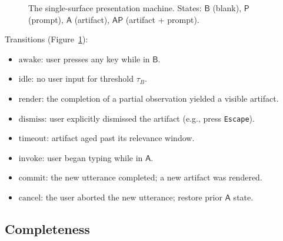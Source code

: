 \documentclass[11pt,twocolumn,a4paper]{article}
\theoremstyle{definition}
\theoremstyle{remark}
\begin{document}
\begin{figure}[t]
\centering
{}
\caption{The single-surface presentation machine. States: $\mathsf{B}$ (blank), $\mathsf{P}$ (prompt), $\mathsf{A}$ (artifact), $\mathsf{AP}$ (artifact + prompt).}
\label{fig:ssp}
\end{figure}

Transitions (Figure~\ref{fig:ssp}):
\begin{itemize}
    \item $\text{awake}$: user presses any key while in $\mathsf{B}$.
    \item $\text{idle}$: no user input for threshold $\tau_B$.
    \item $\text{render}$: the completion of a partial observation yielded a visible artifact.
    \item $\text{dismiss}$: user explicitly dismissed the artifact (e.g., press \texttt{Escape}).
    \item $\text{timeout}$: artifact aged past its relevance window.
    \item $\text{invoke}$: user began typing while in $\mathsf{A}$.
    \item $\text{commit}$: the new utterance completed; a new artifact was rendered.
    \item $\text{cancel}$: the user aborted the new utterance; restore prior $\mathsf{A}$ state.
\end{itemize}

\subsection{Completeness}
\end{document}
